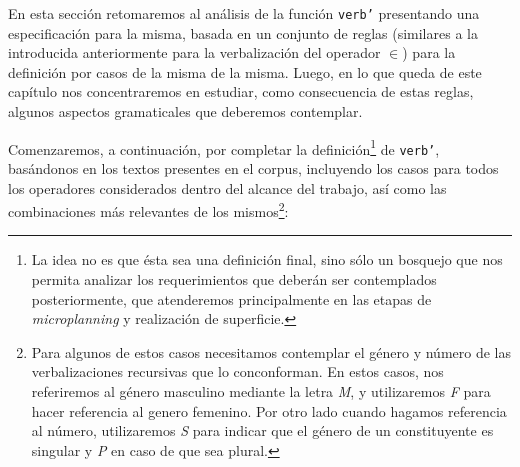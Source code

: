 En esta sección retomaremos al análisis de la función \texttt{verb'} presentando una especificación para la misma, basada en un conjunto de reglas (similares a la introducida anteriormente para la verbalización del operador $\in$) para la definición por casos de la misma de la misma. Luego, en lo que queda de este capítulo nos concentraremos en estudiar, como consecuencia de estas reglas, algunos aspectos gramaticales que deberemos contemplar.

Comenzaremos, a continuación, por completar la definición\footnote{La idea no es que ésta sea una definición final, sino sólo un bosquejo que nos permita analizar los requerimientos que deberán ser contemplados posteriormente, que atenderemos principalmente en las etapas de \textit{microplanning} y realización de superficie.} de \texttt{verb'}, basándonos en los textos presentes en el corpus, incluyendo los casos para todos los operadores considerados dentro del alcance del trabajo, así como las combinaciones más relevantes de los mismos\footnote{Para algunos de estos casos necesitamos contemplar el género y número de las verbalizaciones recursivas que lo conconforman. En estos casos, nos referiremos al género masculino mediante la letra \emph{M}, y utilizaremos \emph{F} para hacer referencia al genero femenino. Por otro lado cuando hagamos referencia al número, utilizaremos \emph{S} para indicar que el género de un constituyente es singular y \emph{P} en caso de que sea plural.}:

